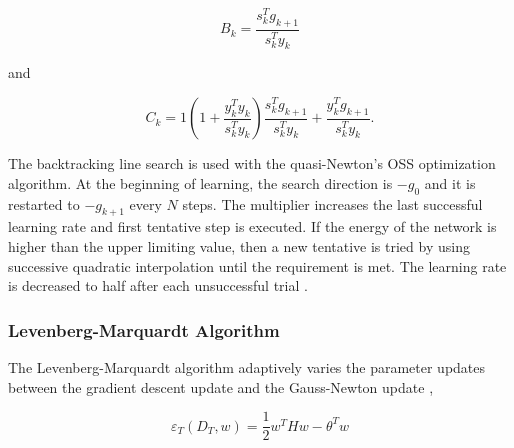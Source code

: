 \begin{equation}
\label{eq:oss2}
B_k = \frac{s^T_k g_{k+1}}{s^T_k y_k}
\end{equation}

and

\begin{equation}
\label{eq:oss3}
C_k = 1 \left(1 + \frac{y^T_k y_k}{s^T_k y_k} \right)  \frac{s^T_k g_{k+1}}{s^T_k y_k} + \frac{y^T_k g_{k+1}}{s^T_k y_k} .
\end{equation}

The backtracking line search is used with the quasi-Newton's OSS optimization algorithm. At the beginning of learning, the search direction is $-g_0$ and it is restarted to $-g_{k+1}$ every $N$ steps. The multiplier increases the last successful learning rate and first tentative step is executed. If the energy of the network is higher than the upper limiting value, then a new tentative is tried by using successive quadratic interpolation until the requirement is met. The learning rate is decreased to half after each unsuccessful trial \cite{saini2002artificial}.

\subsubsection{Levenberg-Marquardt Algorithm}

The Levenberg-Marquardt algorithm adaptively varies the parameter updates between the gradient descent update and the Gauss-Newton update \cite{marquardt1963algorithm},

\begin{equation}
\label{eq:scg}
\varepsilon_T(D_T,w) = \frac{1}{2}w^THw - \theta^Tw
\end{equation}

